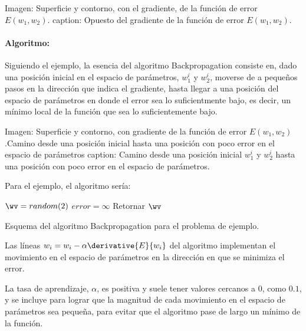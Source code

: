 Imagen: Superficie y contorno, con el gradiente, de la función de error $E(w_1,w_2)$.
caption: Opuesto del gradiente de la función de error $E(w_1,w_2)$.

\paragraph{Algoritmo:}

Siguiendo el ejemplo, la esencia del algoritmo Backpropagation consiste en, dado una posición inicial en el espacio de parámetros, $w_1^i$ y $w_2^i$, moverse de a pequeños pasos en la dirección que indica el gradiente, hasta llegar a una posición del espacio de parámetros en donde el error sea lo suficientmente bajo, es decir, un mínimo local de la función que sea lo suficientemente bajo.

Imagen: Superficie y contorno, con gradiente de la función de error $E(w_1,w_2)$.Camino desde una posición inicial hasta una posición con poco error en el espacio de parámetros
caption: Camino desde una posición inicial $w_1^i$ y $w_2^i$ hasta una posición con poco error en el espacio de parámetros.

Para el ejemplo, el algoritmo sería:

\begin{algorithm}[H]
$\wv=random(2)$\;
$error=\infty$ \;
Retornar  $\wv$ \;
\caption{Esquema del algoritmo Backpropagation para el problema de ejemplo.} 
\end{algorithm}

Las líneas $w_i = w_i - \alpha \derivative{E}{w_i}$ del algoritmo implementan el movimiento en el espacio de parámetros en la dirección en que se minimiza el error.

La tasa de aprendizaje, $\alpha$, es positiva y suele tener valores cercanos a 0, como $0.1$, y se incluye para lograr que la magnitud de cada movimiento en el espacio de parámetros sea pequeña, para evitar que el algoritmo pase de largo un mínimo de la función.

